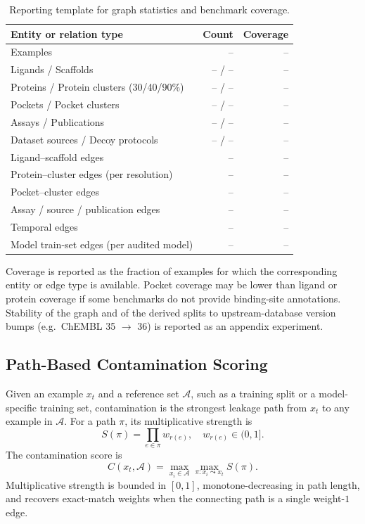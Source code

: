 \documentclass[11pt]{article}
\begin{document}
\begin{table}[h]
\centering
\caption{Reporting template for graph statistics and benchmark coverage.}
\label{tab:kgstats}
\begin{tabular}{lrr}
\toprule
\textbf{Entity or relation type} & \textbf{Count} & \textbf{Coverage} \\
\midrule
Examples & -- & -- \\
Ligands / Scaffolds & -- / -- & -- \\
Proteins / Protein clusters (30/40/90\%) & -- / -- & -- \\
Pockets / Pocket clusters & -- / -- & -- \\
Assays / Publications & -- / -- & -- \\
Dataset sources / Decoy protocols & -- / -- & -- \\
Ligand--scaffold edges & -- & -- \\
Protein--cluster edges (per resolution) & -- & -- \\
Pocket--cluster edges & -- & -- \\
Assay / source / publication edges & -- & -- \\
Temporal edges & -- & -- \\
Model train-set edges (per audited model) & -- & -- \\
\bottomrule
\end{tabular}
\end{table}

Coverage is reported as the fraction of examples for which the corresponding entity or edge type is available. Pocket coverage may be lower than ligand or protein coverage if some benchmarks do not provide binding-site annotations. Stability of the graph and of the derived splits to upstream-database version bumps (e.g.\ ChEMBL 35 \(\to\) 36) is reported as an appendix experiment.

\subsection{Path-Based Contamination Scoring}

Given an example \(x_t\) and a reference set \(\mathcal{A}\), such as a training split or a model-specific training set, contamination is the strongest leakage path from \(x_t\) to any example in \(\mathcal{A}\). For a path \(\pi\), its multiplicative strength is
\[
S(\pi) = \prod_{e\in \pi} w_{r(e)},
\quad w_{r(e)} \in (0, 1].
\]
The contamination score is
\[
C(x_t, \mathcal{A})
=
\max_{x_i \in \mathcal{A}}
\max_{\pi: x_i \leadsto x_t}
S(\pi).
\]
Multiplicative strength is bounded in \([0,1]\), monotone-decreasing in path length, and recovers exact-match weights when the connecting path is a single weight-\(1\) edge.
\end{document}

